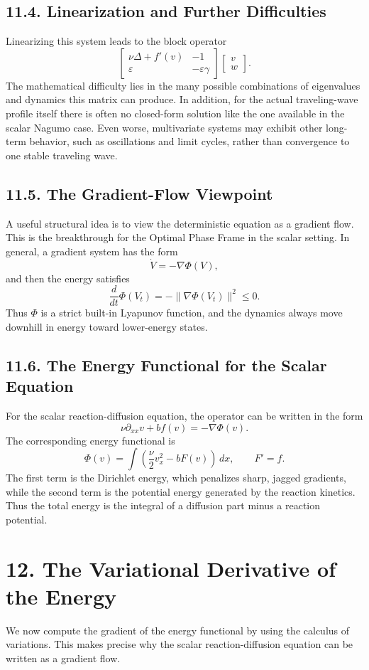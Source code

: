 \documentclass[11pt]{article}
\theoremstyle{definition}
\theoremstyle{remark}
\begin{document}
\subsection*{11.4. Linearization and Further Difficulties}
Linearizing this system leads to the block operator
\[
\begin{bmatrix}
\nu\Delta+f'(v) & -1 \\
\varepsilon & -\varepsilon\gamma
\end{bmatrix}
\begin{bmatrix}
v\\
w
\end{bmatrix}.
\]
The mathematical difficulty lies in the many possible combinations of eigenvalues and dynamics this matrix can produce. In addition, for the actual traveling-wave profile itself there is often no closed-form solution like the one available in the scalar Nagumo case. Even worse, multivariate systems may exhibit other long-term behavior, such as oscillations and limit cycles, rather than convergence to one stable traveling wave.

\subsection*{11.5. The Gradient-Flow Viewpoint}
A useful structural idea is to view the deterministic equation as a gradient flow. This is the breakthrough for the Optimal Phase Frame in the scalar setting. In general, a gradient system has the form
\[
\dot V=-\nabla\Phi(V),
\]
and then the energy satisfies
\[
\frac{d}{dt}\Phi(V_t)=-\|\nabla\Phi(V_t)\|^2\leq 0.
\]
Thus $\Phi$ is a strict built-in Lyapunov function, and the dynamics always move downhill in energy toward lower-energy states.

\subsection*{11.6. The Energy Functional for the Scalar Equation}
For the scalar reaction-diffusion equation, the operator can be written in the form
\[
\nu\partial_{xx}v+bf(v)=-\nabla\Phi(v).
\]
The corresponding energy functional is
\[
\Phi(v)=\int\left(\frac{\nu}{2}v_x^2-bF(v)\right)\,dx,
\qquad
F'=f.
\]
The first term is the Dirichlet energy, which penalizes sharp, jagged gradients, while the second term is the potential energy generated by the reaction kinetics. Thus the total energy is the integral of a diffusion part minus a reaction potential.

\section*{12. The Variational Derivative of the Energy}
We now compute the gradient of the energy functional by using the calculus of variations. This makes precise why the scalar reaction-diffusion equation can be written as a gradient flow.
\end{document}
